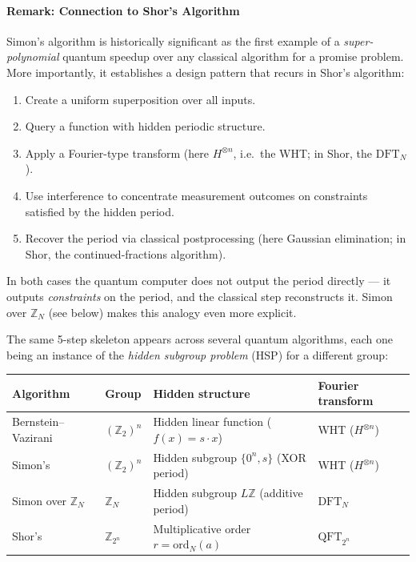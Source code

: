 \paragraph{Remark: Connection to Shor's Algorithm}

Simon's algorithm is historically significant as the first example of a \emph{super-polynomial} quantum speedup over any classical algorithm for a promise problem. More importantly, it establishes a design pattern that recurs in Shor's algorithm:
\begin{enumerate}
    \item Create a uniform superposition over all inputs.
    \item Query a function with hidden periodic structure.
    \item Apply a Fourier-type transform (here $H^{\otimes n}$, i.e.\ the WHT; in Shor, the $\mathrm{DFT}_N$).
    \item Use interference to concentrate measurement outcomes on constraints satisfied by the hidden period.
    \item Recover the period via classical postprocessing (here Gaussian elimination; in Shor, the continued-fractions algorithm).
\end{enumerate}
In both cases the quantum computer does not output the period directly --- it outputs \emph{constraints} on the period, and the classical step reconstructs it. Simon over $\mathbb{Z}_N$ (see below) makes this analogy even more explicit.

The same 5-step skeleton appears across several quantum algorithms, each one being an instance of the \emph{hidden subgroup problem} (HSP) for a different group:

\begin{center}
\begin{tabular}{llll}
\hline
\textbf{Algorithm} & \textbf{Group} & \textbf{Hidden structure} & \textbf{Fourier transform} \\
\hline
Bernstein--Vazirani & $(\mathbb{Z}_2)^n$ & Hidden linear function ($f(x)=s\cdot x$) & WHT ($H^{\otimes n}$) \\
Simon's            & $(\mathbb{Z}_2)^n$ & Hidden subgroup $\{0^n,s\}$ (XOR period)  & WHT ($H^{\otimes n}$) \\
Simon over $\mathbb{Z}_N$ & $\mathbb{Z}_N$ & Hidden subgroup $L\mathbb{Z}$ (additive period) & $\mathrm{DFT}_N$ \\
Shor's             & $\mathbb{Z}_{2^n}$ & Multiplicative order $r = \mathrm{ord}_N(a)$ & $\mathrm{QFT}_{2^n}$ \\
\hline
\end{tabular}
\end{center}


